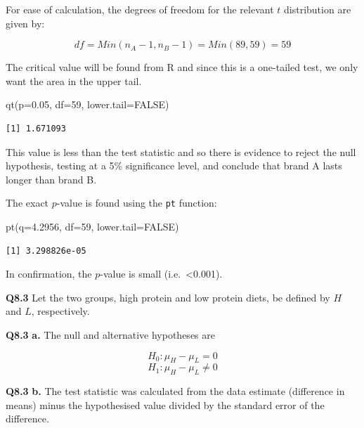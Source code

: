 \documentclass[
  oneside]{krantz}
\newenvironment{Shaded}{\begin{snugshade}}{\end{snugshade}}
\newcommand{\AttributeTok}[1]{\textcolor[rgb]{0.77,0.63,0.00}{#1}}
\newcommand{\ConstantTok}[1]{\textcolor[rgb]{0.00,0.00,0.00}{#1}}
\newcommand{\DecValTok}[1]{\textcolor[rgb]{0.00,0.00,0.81}{#1}}
\newcommand{\FloatTok}[1]{\textcolor[rgb]{0.00,0.00,0.81}{#1}}
\newcommand{\FunctionTok}[1]{\textcolor[rgb]{0.00,0.00,0.00}{#1}}
\newcommand{\NormalTok}[1]{#1}
\begin{document}
For ease of calculation, the degrees of freedom for the relevant \(t\) distribution are given by:

\[df = Min(n_A - 1, n_B - 1) = Min(89, 59) = 59\]

The critical value will be found from R and since this is a one-tailed test, we only want the area in the upper tail.

\begin{Shaded}
\begin{Highlighting}[]
\FunctionTok{qt}\NormalTok{(}\AttributeTok{p=}\FloatTok{0.05}\NormalTok{, }\AttributeTok{df=}\DecValTok{59}\NormalTok{, }\AttributeTok{lower.tail=}\ConstantTok{FALSE}\NormalTok{)}
\end{Highlighting}
\end{Shaded}

\begin{verbatim}
[1] 1.671093
\end{verbatim}

This value is less than the test statistic and so there is evidence to reject the null hypothesis, testing at a 5\% significance level, and conclude that brand A lasts longer than brand B.

The exact \(p\)-value is found using the \texttt{pt} function:

\begin{Shaded}
\begin{Highlighting}[]
\FunctionTok{pt}\NormalTok{(}\AttributeTok{q=}\FloatTok{4.2956}\NormalTok{, }\AttributeTok{df=}\DecValTok{59}\NormalTok{, }\AttributeTok{lower.tail=}\ConstantTok{FALSE}\NormalTok{)}
\end{Highlighting}
\end{Shaded}

\begin{verbatim}
[1] 3.298826e-05
\end{verbatim}

In confirmation, the \(p\)-value is small (i.e.~\textless0.001).

\textbf{Q8.3} Let the two groups, high protein and low protein diets, be defined by \(H\) and \(L\), respectively.

\textbf{Q8.3} \textbf{a.} The null and alternative hypotheses are

\[H_0: \mu_H - \mu_L = 0\]
\[H_1: \mu_H - \mu_L \ne 0\]

\textbf{Q8.3} \textbf{b.} The test statistic was calculated from the data estimate (difference in means) minus the hypothesised value divided by the standard error of the difference.
\end{document}
